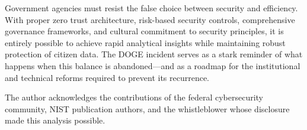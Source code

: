 \documentclass[sigconf,nonacm]{acmart}
\begin{document}
Government agencies must resist the false choice between security and efficiency. With
proper zero trust architecture, risk-based security controls, comprehensive governance
frameworks, and cultural commitment to security principles, it is entirely possible to
achieve rapid analytical insights while maintaining robust protection of citizen data.
The DOGE incident serves as a stark reminder of what happens when this balance is
abandoned---and as a roadmap for the institutional and technical reforms required to
prevent its recurrence.

\begin{acks}
The author acknowledges the contributions of the federal cybersecurity community,
NIST publication authors, and the whistleblower whose disclosure made this analysis
possible.
\end{acks}
\end{document}
